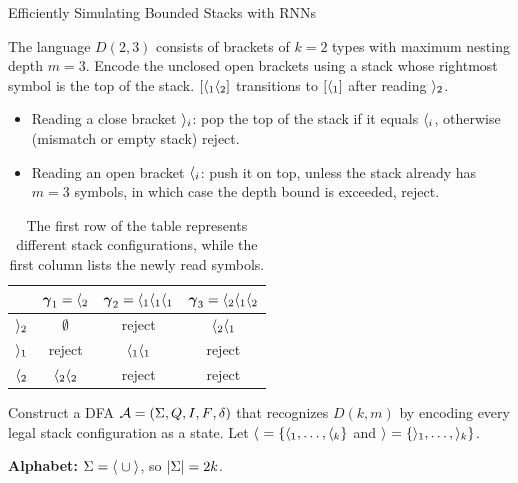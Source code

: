 \begin{question}{Efficiently Simulating Bounded Stacks with RNNs}

\begin{subquestion}
    The language $D(2, 3)$ consists of brackets of $k = 2$ types with maximum nesting depth $m = 3$. 
    Encode the unclosed open brackets using a stack whose rightmost symbol is the top of the stack.
    $[\openBr{1}\openBr{2}]$ transitions to $[\openBr{1}]$ after reading $\closeBr{2}$.
    \begin{itemize}
        \item Reading a close bracket $\closeBr{i}$: pop the top of the stack if it equals $\openBr{i}$, otherwise (mismatch or empty stack) reject.
        \item Reading an open bracket $\openBr{i}$: push it on top, unless the stack already has $m = 3$ symbols, in which case the depth bound is exceeded, reject.
    \end{itemize}
    \begin{table}[H]
    \centering
        \begin{tabular}{cccc}
            \toprule
            & $\stackseq_1 = \openBr{2}$ &
            $\stackseq_2 = \openBr{1} \openBr{1} \openBr{1}$ &
            $\stackseq_3 = \openBr{2} \openBr{1} \openBr{2}$ \\
            \midrule
            $\closeBr{2}$ & $\emptystack$ & reject & $\openBr{2}\openBr{1}$ \\
            $\closeBr{1}$ & reject & $\openBr{1}\openBr{1}$ & reject \\
            $\openBr{2}$ & $\openBr{2}\openBr{2}$ & reject & reject \\
            \bottomrule
        \end{tabular}
        \caption{The first row of the table represents different stack configurations, while the first column lists the newly read symbols.}
        \label{tab:stackconfigs}
    \end{table}
\end{subquestion}

\begin{subquestion}
    Construct a DFA $\mathcal{A} = \fsatuple$ that recognizes $D(k, m)$ by encoding every legal stack configuration as a state. 
    Let $\openBr{} = \{\openBr{1}, \dots, \openBr{k}\}$ and $\closeBr{} = \{\closeBr{1}, \dots, \closeBr{k}\}$.
    
    \textbf{Alphabet:} $\alphabet = \openBr{} \cup \closeBr{}$, so $\nsymbols = 2k$.
    

\end{subquestion}
\end{question}
